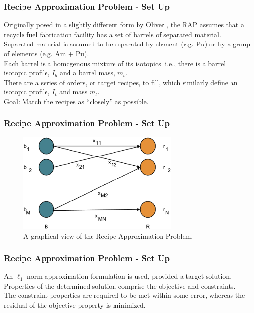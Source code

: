 \begin{frame}[ctb!]
  \frametitle{Recipe Approximation Problem - Set Up} 

  Originally posed in a slightly different form by Oliver
  \cite{oliver_geniusv2:_2009 }, the RAP assumes that a recycle fuel fabrication
  facility has a set of barrels of separated material. \\

  Separated material is assumed to be separated by element (e.g. Pu) or by a
  group of elements (e.g. Am + Pu). \\

  Each barrel is a homogenous mixture of its isotopics, i.e., there is a barrel
  isotopic profile, $I_b$ and a barrel mass, $m_b$.\\

  There are a series of orders, or target recipes, to fill, which similarly
  define an isotopic profile, $I_t$ and mass $m_t$.\\

  Goal: Match the recipes as ``closely'' as possible.
\end{frame}

\begin{frame}[ctb!]
  \frametitle{Recipe Approximation Problem - Set Up} 
    \begin{figure}
    \includegraphics[height=5cm]{./images/rap.eps}
    \caption{A graphical view of the Recipe Approximation Problem.}
  \end{figure}
\end{frame}

\begin{frame}[ctb!]
  \frametitle{Recipe Approximation Problem - Set Up} 

  An $\ell_1$ norm approximation formulation is used, provided a target
  solution.\\
  
  Properties of the determined solution comprise the objective and
  constraints.\\

  The constraint properties are required to be met within some error, whereas
  the residual of the objective property is minimized.
\end{frame}

